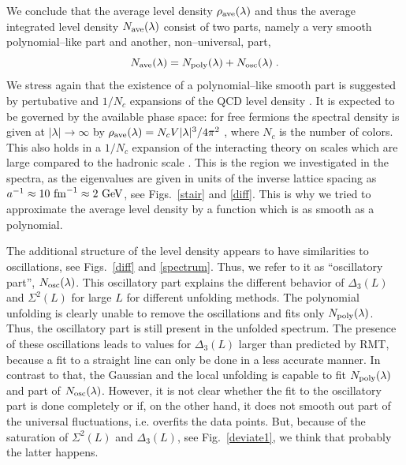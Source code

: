 We conclude that the average level density $\rho_{\rm ave}(\lambda)$ and
thus the average integrated level density $N_{\rm ave}(\lambda)$
consist of two parts, namely a very smooth polynomial--like part and
another, non--universal, part,
\begin{equation}
N_{\rm ave}(\lambda)=N_{\rm poly}(\lambda)+N_{\rm osc}(\lambda)\;.
\end{equation}
We stress again that the existence of a polynomial--like smooth part
is suggested by pertubative and $1/N_c$ expansions of the QCD level
density \cite{kogut83,smilga93}. It is expected to be governed by the
available phase space: for free fermions the spectral density is given
at $|\lambda|\to\infty$ by $\rho_{\rm
  ave}(\lambda)=N_cV|\lambda|^3/4\pi^2$ \cite{leutsmilga}, where $N_c$
is the number of colors. This also holds in a $1/N_c$ expansion of
the interacting theory on scales which are large compared to the
hadronic scale \cite{smilga93}. This is the region we investigated in
the spectra, as the eigenvalues are given in units of the inverse
lattice spacing as $a^{-1}\approx10~{\rm fm}^{-1}\approx2~{\rm GeV}$,
see Figs.~\ref{stair} and \ref{diff}. This is why we tried to
approximate the average level density by a function which is as smooth
as a polynomial.

The additional structure of the level density appears to have
similarities to oscillations, see Figs.~\ref{diff} and \ref{spectrum}.
Thus, we refer to it as ``oscillatory part'', $N_{\rm osc}(\lambda)$.
This oscillatory part explains the different behavior of $\Delta_3(L)$
and $\Sigma^2(L)$ for large $L$ for different unfolding methods.  The
polynomial unfolding is clearly unable to remove the oscillations and
fits only $N_{\rm poly}(\lambda)$. Thus, the oscillatory part is still
present in the unfolded spectrum.  The presence of these oscillations
leads to values for $\Delta_3(L)$ larger than predicted by RMT,
because a fit to a straight line can only be done in a less accurate
manner. In contrast to that, the Gaussian and the local unfolding is
capable to fit $N_{\rm poly}(\lambda)$ and part of $N_{\rm
  osc}(\lambda)$.  However, it is not clear whether the fit to the
oscillatory part is done completely or if, on the other hand, it does
not smooth out part of the universal fluctuations, i.e.  overfits the
data points. But, because of the saturation of $\Sigma^2(L)$ and
$\Delta_3(L)$, see Fig.~\ref{deviate1}, we think that probably the
latter happens.

